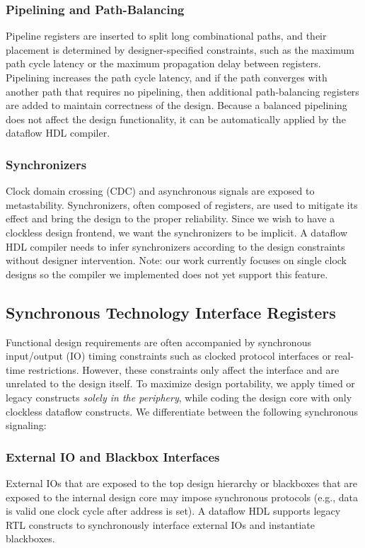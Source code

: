 \subsubsection{Pipelining and Path-Balancing}
Pipeline registers are inserted to split long combinational paths, and their placement is determined by designer-specified constraints, such as the maximum path cycle latency or the maximum propagation delay between registers. Pipelining increases the path cycle latency, and if the path converges with another path that requires no pipelining, then additional path-balancing registers are added to maintain correctness of the design. Because a balanced pipelining does not affect the design functionality, it can be automatically applied by the dataflow HDL compiler.   
\subsubsection{Synchronizers}
Clock domain crossing (CDC) and asynchronous signals are exposed to metastability. Synchronizers, often composed of registers, are used to mitigate its effect and bring the design to the proper reliability. Since we wish to have a clockless design frontend, we want the synchronizers to be implicit. A dataflow HDL compiler needs to infer synchronizers according to the design constraints without designer intervention. Note: our work currently focuses on single clock designs so the compiler we implemented does not yet support this feature.

\subsection{Synchronous Technology Interface Registers}
Functional design requirements are often accompanied by synchronous input/output (IO) timing constraints such as clocked protocol interfaces or real-time restrictions. However, these constraints only affect the interface and are unrelated to the design itself. To maximize design portability, we apply timed or legacy constructs \emph{solely in the periphery}, while coding the design core with only clockless dataflow constructs. We differentiate between the following synchronous signaling:
\subsubsection{External IO and Blackbox Interfaces}
External IOs that are exposed to the top design hierarchy or blackboxes that are exposed to the internal design core may impose synchronous protocols (e.g., data is valid one clock cycle after address is set). A dataflow HDL supports legacy RTL constructs to synchronously interface external IOs and instantiate blackboxes. 
